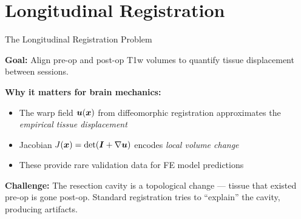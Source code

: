 
\section{Longitudinal Registration}

\begin{frame}{The Longitudinal Registration Problem}

  \textbf{Goal:} Align pre-op and post-op T1w volumes to quantify
  tissue displacement between sessions.

  \bigskip

  \textbf{Why it matters for brain mechanics:}
  \begin{itemize}
    \item The warp field $\bm{u}(\bm{x})$ from diffeomorphic registration
      approximates the \emph{empirical tissue displacement}
    \item Jacobian $J(\bm{x}) = \det(\bm{I} + \nabla\bm{u})$ encodes
      \emph{local volume change}
    \item These provide rare \alert{validation data} for FE model
      predictions
  \end{itemize}

  \bigskip

  \textbf{Challenge:} The resection cavity is a topological change ---
  tissue that existed pre-op is gone post-op. Standard registration
  tries to ``explain'' the cavity, producing artifacts.

\end{frame}


